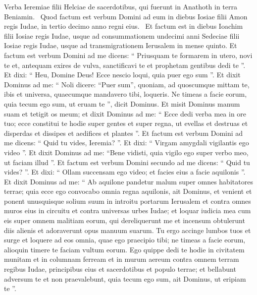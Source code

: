 \begin{biblechapter}
 \verse Verba Ieremiae filii Helciae de sacerdotibus, qui fuerunt in Anathoth in terra Beniamin. 
 \verse Quod factum est verbum Domini ad eum in diebus Iosiae filii Amon regis Iudae, in tertio decimo anno regni eius. 
 \verse Et factum est in diebus Ioachim filii Iosiae regis Iudae, usque ad consummationem undecimi anni Sedeciae filii Iosiae regis Iudae, usque ad transmigrationem Ierusalem in mense quinto.
 \verse Et factum est verbum Domini ad me dicens:
 \verse “ Priusquam te formarem in utero, novi te
 et, antequam exires de vulva, sanctificavi te
 et prophetam gentibus dedi te ”.
 \verse Et dixi: “ Heu, Domine Deus! Ecce nescio loqui, quia puer ego sum ”.
 \verse Et dixit Dominus ad me: “ Noli dicere: “Puer sum”,
 quoniam, ad quoscumque mittam te, ibis
 et universa, quaecumque mandavero tibi, loqueris.
 \verse Ne timeas a facie eorum,
 quia tecum ego sum, ut eruam te ”,
 dicit Dominus.
 \verse Et misit Dominus manum suam et tetigit os meum; et dixit Dominus ad me:
 “ Ecce dedi verba mea in ore tuo;
 \verse ecce constitui te hodie super gentes et super regna,
 ut evellas et destruas
 et disperdas et dissipes
 et aedifices et plantes ”.
 \verse Et factum est verbum Domini ad me dicens: “ Quid tu vides, Ieremia? ”. Et dixi: “ Virgam amygdali vigilantis ego video ”. 
\verse Et dixit Dominus ad me: “Bene vidisti, quia vigilo ego super verbo meo, ut faciam illud ”.
 \verse Et factum est verbum Domini secundo ad me dicens: “ Quid tu vides? ”. Et dixi: “ Ollam succensam ego video; et facies eius a facie aquilonis ”. 
\verse Et dixit Dominus ad me:
 “ Ab aquilone pandetur malum
 super omnes habitatores terrae;
 \verse quia ecce ego convocabo
 omnia regna aquilonis,
 ait Dominus,
 et venient et ponent unusquisque solium suum
 in introitu portarum Ierusalem
 et contra omnes muros eius in circuitu
 et contra universas urbes Iudae;
 \verse et loquar iudicia mea cum eis
 super omnem malitiam eorum,
 qui dereliquerunt me
 et incensum obtulerunt diis alienis
 et adoraverunt opus manuum suarum.
 \verse Tu ergo accinge lumbos tuos
 et surge et loquere ad eos omnia,
 quae ego praecipio tibi;
 ne timeas a facie eorum,
 alioquin timere te faciam vultum eorum.
 \verse Ego quippe dedi te hodie
 in civitatem munitam
 et in columnam ferream
 et in murum aereum
 contra omnem terram
 regibus Iudae, principibus eius
 et sacerdotibus et populo terrae;
 \verse et bellabunt adversum te et non praevalebunt,
 quia tecum ego sum,
 ait Dominus,
 ut eripiam te ”.
 

\end{biblechapter}
